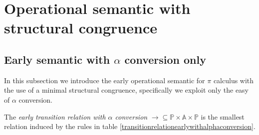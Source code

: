 \section{Operational semantic with structural congruence}

\subsection{Early semantic with $\alpha$ conversion only}
In this subsection we introduce the early operational semantic for $\pi$ calculus with the use of a minimal structural congruence, specifically we exploit only the easy of $\alpha$ conversion.

\begin{definition}
  The \emph{early transition relation with $\alpha$ conversion} $\rightarrow\subseteq \mathbb{P}\times \mathbb{A} \times \mathbb{P}$ is the smallest relation induced by the rules in table \ref{transitionrelationearlywithalphaconversion}.


\end{definition}
